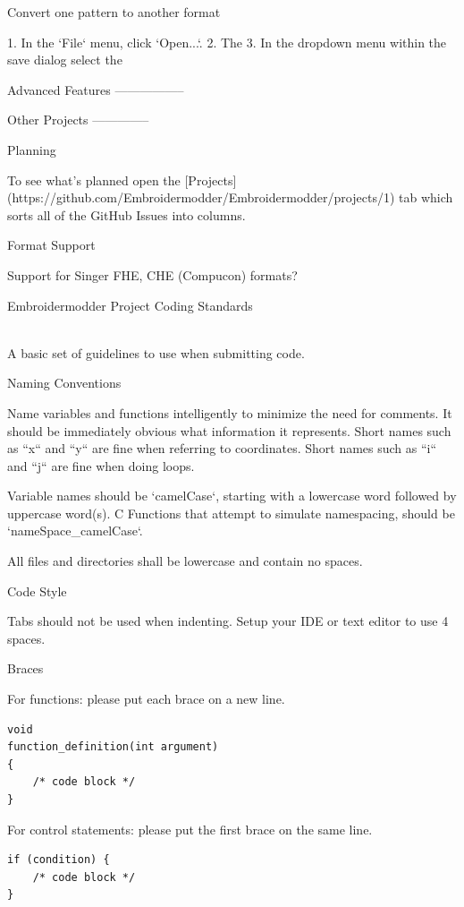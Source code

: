 \documentclass[a4paper]{report}
\begin{document}
Convert one pattern to another format
~~~~~~~~~~~~~~~~~~~~~~~~~~~~~~~~~~~~~

1. In the `File` menu, click `Open...`.
2. The 
3. In the dropdown menu within the save dialog select the 

Advanced Features
-----------------

Other Projects
--------------


Planning
~~~~~~~~

To see what's planned open the [Projects](https://github.com/Embroidermodder/Embroidermodder/projects/1) tab which sorts all of the GitHub Issues into columns.

Format Support
~~~~~~~~~~~~~~

Support for Singer FHE, CHE (Compucon) formats?

Embroidermodder Project Coding Standards
~~~~~~~~~~~~~~~~~~~~~~~~~~~~~~~~~~~~~~~~

A basic set of guidelines to use when submitting code.

Naming Conventions
~~~~~~~~~~~~~~~~~~

Name variables and functions intelligently to minimize the need for comments.
It should be immediately obvious what information it represents.
Short names such as ``x`` and ``y`` are fine when referring to coordinates.
Short names such as ``i`` and ``j`` are fine when doing loops.

Variable names should be `camelCase`, starting with a lowercase word followed by uppercase word(s).
C Functions that attempt to simulate namespacing, should be `nameSpace\_camelCase`.

All files and directories shall be lowercase and contain no spaces.

Code Style
~~~~~~~~~~

Tabs should not be used when indenting. Setup your IDE or text editor to use 4 spaces.

Braces
~~~~~~

For functions: please put each brace on a new line.

\begin{lstlisting}
void
function_definition(int argument)
{
    /* code block */
}
\end{lstlisting}

For control statements: please put the first brace on the same line.

\begin{lstlisting}
if (condition) {
    /* code block */    
}
\end{lstlisting}
\end{document}
